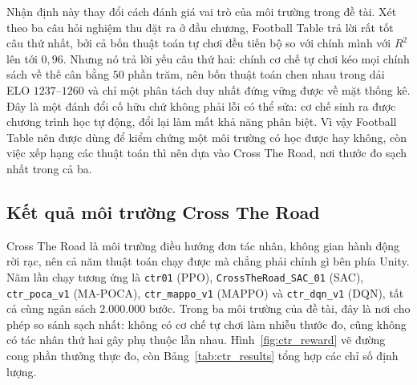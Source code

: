 \indent Nhận định này thay đổi cách đánh giá vai trò của môi trường trong đề tài. Xét theo ba
câu hỏi nghiệm thu đặt ra ở đầu chương, Football Table trả lời rất tốt câu thứ nhất, bởi cả
bốn thuật toán tự chơi đều tiến bộ so với chính mình với $R^{2}$ lên tới $0{,}96$. Nhưng nó
trả lời yếu câu thứ hai: chính cơ chế tự chơi kéo mọi chính sách về thế cân bằng $50$ phần
trăm, nên bốn thuật toán chen nhau trong dải ELO $1237$--$1260$ và chỉ một phân tách duy nhất
đứng vững được về mặt thống kê. Đây là một đánh đổi cố hữu chứ không phải lỗi có thể sửa: cơ
chế sinh ra được chương trình học tự động, đổi lại làm mất khả năng phân biệt. Vì vậy Football
Table nên được dùng để kiểm chứng một môi trường có học được hay không, còn việc xếp hạng các
thuật toán thì nên dựa vào Cross The Road, nơi thước đo sạch nhất trong cả ba.

\subsection{Kết quả môi trường Cross The Road}

{\sloppy
\indent Cross The Road là môi trường điều hướng đơn tác nhân, không gian hành động rời
rạc, nên cả năm thuật toán chạy được mà chẳng phải chỉnh gì bên phía Unity. Năm lần chạy
tương ứng là \texttt{ctr01} (PPO), \texttt{CrossTheRoad\_SAC\_01} (SAC),
\texttt{ctr\_poca\_v1} (MA-POCA), \texttt{ctr\_mappo\_v1} (MAPPO) và \texttt{ctr\_dqn\_v1}
(DQN), tất cả cùng ngân sách $2.000.000$ bước. Trong ba môi trường của đề tài, đây là nơi
cho phép so sánh sạch nhất: không có cơ chế tự chơi làm nhiễu thước đo, cũng không có tác
nhân thứ hai gây phụ thuộc lẫn nhau. Hình~\ref{fig:ctr_reward} vẽ đường cong phần thưởng
thực đo, còn Bảng~\ref{tab:ctr_results} tổng hợp các chỉ số định lượng.\par}

